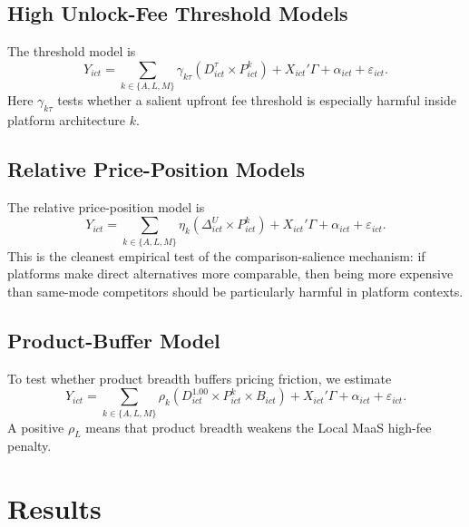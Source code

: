 \documentclass[11pt]{article}
\begin{document}
\subsection{High Unlock-Fee Threshold Models}

The threshold model is
\[
Y_{ict}=\sum_{k\in\{A,L,M\}}\gamma_{k\tau}(D^{\tau}_{ict}\times P^{k}_{ict})
+X_{ict}'\Gamma+\alpha_{ict}+\varepsilon_{ict}.
\]
Here $\gamma_{k\tau}$ tests whether a salient upfront fee threshold is especially harmful
inside platform architecture $k$.

\subsection{Relative Price-Position Models}

The relative price-position model is
\[
Y_{ict}=\sum_{k\in\{A,L,M\}}\eta_k(\Delta^U_{ict}\times P^{k}_{ict})
+X_{ict}'\Gamma+\alpha_{ict}+\varepsilon_{ict}.
\]
This is the cleanest empirical test of the comparison-salience mechanism: if platforms make
direct alternatives more comparable, then being more expensive than same-mode competitors
should be particularly harmful in platform contexts.

\subsection{Product-Buffer Model}

To test whether product breadth buffers pricing friction, we estimate
\[
Y_{ict}=\sum_{k\in\{A,L,M\}}\rho_k(D^{1.00}_{ict}\times P^{k}_{ict}\times B_{ict})
+X_{ict}'\Gamma+\alpha_{ict}+\varepsilon_{ict}.
\]
A positive $\rho_L$ means that product breadth weakens the Local MaaS high-fee penalty.

\section{Results}
\end{document}
